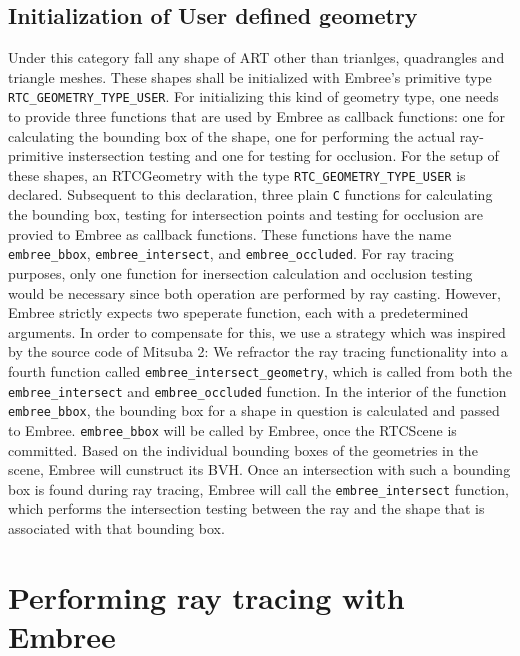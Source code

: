 \subsection{Initialization of User defined geometry}
\label{sec:init_user}
Under this category fall any shape of ART other than trianlges, quadrangles and triangle meshes. These shapes shall be initialized with Embree's primitive type \texttt{RTC\_GEOMETRY\_TYPE\_USER}. For initializing this kind of geometry type, one needs to provide three functions that are used by Embree as callback functions: one for calculating the bounding box of the shape, one for performing the actual ray-primitive instersection testing and one for testing for occlusion. For the setup of these shapes, an RTCGeometry with the type \texttt{RTC\_GEOMETRY\_TYPE\_USER} is declared. Subsequent to this declaration, three plain \texttt{C} functions for calculating the bounding box, testing for intersection points and testing for occlusion are provied to Embree as callback functions.
These functions have the name \texttt{embree\_bbox}, \texttt{embree\_intersect}, and \texttt{embree\_occluded}. For ray tracing purposes, only one function for inersection calculation and occlusion testing would be necessary since both operation are performed by ray casting. However, Embree strictly expects two speperate function, each with a predetermined arguments. In order to compensate for this, we use a strategy which was inspired by the source code of Mitsuba 2: We refractor the ray tracing functionality into a fourth function called \texttt{embree\_intersect\_geometry}, which is called from both the \texttt{embree\_intersect} and \texttt{embree\_occluded} function. 
In the interior of the function \texttt{embree\_bbox}, the bounding box for a shape in question is calculated and passed to Embree. \texttt{embree\_bbox} will be called by Embree, once the RTCScene is committed. Based on the individual bounding boxes of the geometries in the scene, Embree will cunstruct its BVH. Once an intersection with such a bounding box is found during ray tracing, Embree will call the \texttt{embree\_intersect} function, which performs the intersection testing between the ray and the shape that is associated with that bounding box.



\section{Performing ray tracing with Embree}
\label{sec:embree_raycasting}


